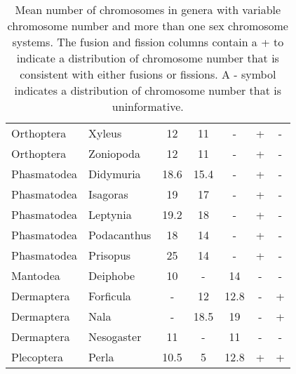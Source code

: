 \begin{table}
\begin{tabular}{llccccc}
Orthoptera             & Xyleus                 & 12                          & 11                          & -                            & +                 & -                 \\
Orthoptera             & Zoniopoda              & 12                          & 11                          & -                            & +                 & -                 \\
Phasmatodea            & Didymuria              & 18.6                        & 15.4                        & -                            & +                 & -                 \\
Phasmatodea            & Isagoras               & 19                          & 17                          & -                            & +                 & -                 \\
Phasmatodea            & Leptynia               & 19.2                        & 18                          & -                            & +                 & -                 \\
Phasmatodea            & Podacanthus            & 18                          & 14                          & -                            & +                 & -                 \\
Phasmatodea            & Prisopus               & 25                          & 14                          & -                            & +                 & -                 \\
Mantodea               & Deiphobe               & 10                          & -                           & 14                           & -                 & -                 \\
Dermaptera             & Forficula              & -                           & 12                          & 12.8                         & -                 & +                 \\
Dermaptera             & Nala                   & -                           & 18.5                        & 19                           & -                 & +                 \\
Dermaptera             & Nesogaster             & 11                          & -                           & 11                           & -                 & -                 \\
Plecoptera             & Perla                  & 10.5                        & 5                           & 12.8                         & +                 & +                 \\ \hline
\end{tabular}
\caption{Mean number of chromosomes in genera with variable chromosome number and more than one sex chromosome systems. The fusion and fission columns contain a + to indicate a distribution of chromosome number that is consistent with either fusions or fissions. A - symbol indicates a distribution of chromosome number that is uninformative.}
\label{tab:fusions}
\end{table}
